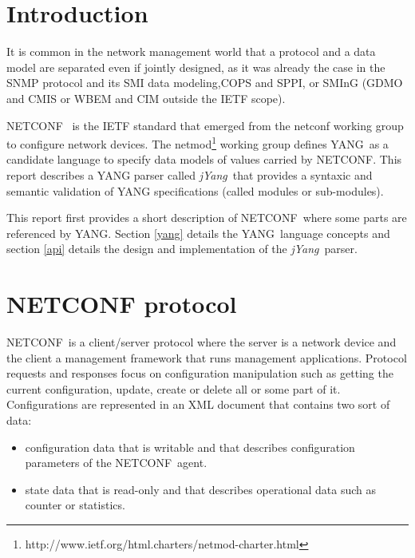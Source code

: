 \documentclass[a4paper]{article}
\newcommand{\jyang}{{\sl jYang}}
\newcommand{\nc}{NETCONF}
\newcommand{\y}{YANG}
\begin{document}
\makeRT  %


\lstset{numbers=left, numberstyle=\tiny, stepnumber=1, numbersep=5pt}

\section{Introduction}

It is common  in the network management world that  a protocol and a
data model are  separated even if jointly designed,  as it was already
the case in the  SNMP\cite{rfc1157} protocol and its SMI\cite{rfc1155}
data   modeling,CO\-PS\cite{rfc2748}   and  SP\-PI\cite{rfc3159},   or
SMI\-nG\cite{rfc3780} (GDMO and CMIS or  WBEM and CIM outside the IETF
scope).

\nc\ \cite{rfc4741} is the IETF standard that emerged from the netconf
working     group    to     configure     network    devices.      The
netmod\footnote{http://www.ietf.org/html.charters/netmod-charter.html}
working  group defines  \y\ as  a candidate  language to  specify data
models of values  carried by \nc.  This report  describes a YANG parser
called  \jyang\ that provides  a syntaxic  and semantic  validation of
YANG specifications (called modules or sub-modules).

This  report first  provides a  short description  of \nc\  where some
parts  are referenced  by  \y.  Section  \ref{yang}  details the  \y\
language  concepts   and section \ref{api}  details  the   design  and
implementation of the \jyang\ parser.


\section{NETCONF protocol}

\nc\ is a client/server protocol  where the server is a network device
and   the  client   a  management   framework  that   runs  management
applications. Protocol  requests and responses  focus on configuration
manipulation such as getting the current configuration, update, create
or delete all or some part of it. Configurations are represented in an
XML document that contains two sort of data:
\begin{itemize}
\item
configuration  data   that  is  writable   and  that  describes
configuration parameters of the \nc\  agent.
\item
state data that is read-only and that describes operational data such
as counter or statistics.
\end{itemize}
\end{document}
